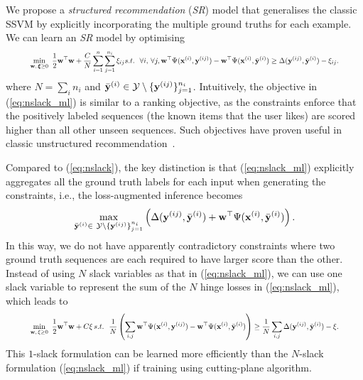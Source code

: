 We propose a \emph{structured recommendation} (\emph{SR}) model that generalises the classic SSVM by explicitly incorporating the multiple ground truths for each example.
We can learn an \emph{SR} model by optimising %
\begin{equation}
\label{eq:nslack_ml}
\resizebox{0.9\linewidth}{!}{$
\begin{aligned}
\min_{\w, \, \bm{\xi} \ge 0} ~ \frac{1}{2} \w^\top \w + \frac{C}{N} \sum_{i=1}^n \sum_{j=1}^{n_i} \xi_{ij} s.t.~~ \forall i, \, \forall j, 
  \w^\top \Psi(\x^{(i)}, \y^{(ij)}) - \w^\top \Psi(\x^{(i)}, \bar{\y}^{(i)}) \ge
  \Delta(\y^{(ij)}, \bar{\y}^{(i)}) - \xi_{ij}.
\end{aligned}
$}
\end{equation}
where $N = \sum_i n_i$ and $\bar{\mathbf{y}}^{(i)} \in \mathcal{Y} \setminus \{\mathbf{y}^{(ij)}\}_{j=1}^{n_i}$.
Intuitively, the objective in (\ref{eq:nslack_ml}) is similar to a ranking objective, as the constraints enforce
that the positively labeled sequences (the known items that the user likes) are scored
higher than all other unseen sequences.
Such objectives have proven useful in classic unstructured recommendation~\cite{bpr09}.

Compared to (\ref{eq:nslack}), the key distinction is that (\ref{eq:nslack_ml})
explicitly aggregates all the ground truth labels for each input when generating the constraints,
i.e., the loss-augmented inference becomes
\begin{equation}
\label{eq:loss_aug_inf}
\max_{\bar{\mathbf{y}}^{(i)} \in \ \mathcal{Y} \setminus \{\mathbf{y}^{(ij)}\}_{j=1}^{n_i}}
     \left( \Delta(\mathbf{y}^{(ij)}, \bar{\mathbf{y}}^{(i)}) + \mathbf{w}^\top \Psi(\mathbf{x}^{(i)}, \bar{\mathbf{y}}^{(i)}) \right).
\end{equation}
In this way, we do not have apparently contradictory constraints where
two ground truth sequences are each required to have larger score than the other.
Instead of using $N$ slack variables as that in (\ref{eq:nslack_ml}),
we can use one slack variable to represent the sum of the $N$ hinge losses in (\ref{eq:nslack_ml}),
which leads to %
\begin{equation}
\label{eq:1slack_ml}
\resizebox{0.9\linewidth}{!}{$
\begin{aligned}
\min_{\w, \, \xi \ge 0} ~\frac{1}{2} \w^\top \w + C \xi \, s.t.~~ \frac{1}{N} \left( \sum_{i,j} \w^\top \Psi(\x^{(i)}, \y^{(ij)}) - \w^\top \Psi(\x^{(i)}, \bar{\y}^{(i)}) \right) 
  \ge \frac{1}{N} \sum_{i,j} \Delta(\y^{(ij)}, \bar{\y}^{(i)}) - \xi.
\end{aligned}
$}
\end{equation}
This $1$-slack formulation can be learned more efficiently than the $N$-slack formulation (\ref{eq:nslack_ml}) if training using cutting-plane algorithm.



